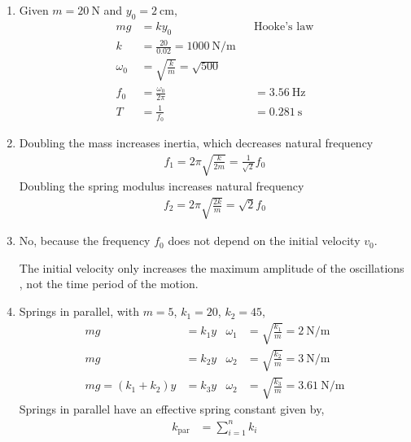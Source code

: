 \begin{enumerate}
    \item Given $ m = \SI{20}{\newton} $ and $ y_{0} = \SI{2}{\cm} $,
          \begin{align}
              mg         & = ky_{0}                                &
                         & \text{Hooke's law}                        \\
              k          & = \frac{20}{0.02} = \SI{1000}{\N\per\m}   \\
              \omega_{0} & = \sqrt{\frac{k}{m}} = \sqrt{500}         \\
              f_{0}      & = \frac{\omega_{0}}{2\pi}               &
                         & = \SI{3.56}{\Hz}                          \\
              T          & = \frac{1}{f_{0}}                       &
                         & = \SI{0.281}{\s}
          \end{align}

    \item Doubling the mass increases inertia, which decreases natural frequency
          \begin{align}
              f_{1} = 2\pi \sqrt{\frac{k}{2m}} = \frac{1}{\sqrt{2}}f_{0}
          \end{align}
          Doubling the spring modulus increases natural frequency
          \begin{align}
              f_{2} = 2\pi \sqrt{\frac{2k}{m}} = \sqrt{2}f_{0}
          \end{align}

    \item No, because the frequency $ f_{0} $ does not depend on the initial velocity
          $ v_{0} $. \par
          The initial velocity only increases the maximum amplitude of the oscillations
          , not the time period of the motion.

    \item Springs in parallel, with $ m = 5 $, $ k_{1} = 20 $, $ k_{2} = 45$,
          \begin{align}
              mg                    & = k_{1}y                                       &
              \omega_{1}            & = \sqrt{\frac{k_{1}}{m}} = \SI{2}{\N\per\m}      \\
              mg                    & = k_{2}y                                       &
              \omega_{2}            & = \sqrt{\frac{k_{2}}{m}} = \SI{3}{\N\per\m}      \\
              mg = (k_{1} + k_{2})y & = k_{3}y                                       &
              \omega_{2}            & = \sqrt{\frac{k_{3}}{m}} = \SI{3.61}{\N\per\m}
          \end{align}
          Springs in parallel have an effective spring constant given by,
          \begin{align}
              k_{\text{par}} & = \sum_{i=1}^{n}k_{i}
          \end{align}


\end{enumerate}
